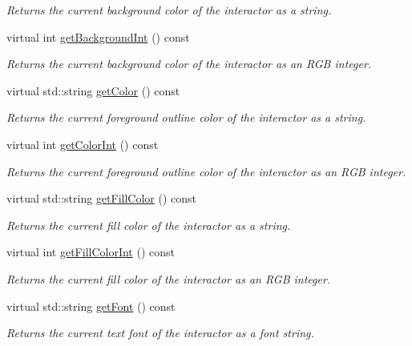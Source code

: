 \begin{DoxyCompactItemize}
\begin{DoxyCompactList}\small\item\em Returns the current background color of the interactor as a string. \end{DoxyCompactList}\item 
virtual int \mbox{\hyperlink{classGDrawingSurface_a9e827257a55cb8cf4d9de2ec6bcfd7a0}{get\+Background\+Int}} () const
\begin{DoxyCompactList}\small\item\em Returns the current background color of the interactor as an R\+GB integer. \end{DoxyCompactList}\item 
virtual std\+::string \mbox{\hyperlink{classGDrawingSurface_aa061dfa488c31e18549d64363c1d0e34}{get\+Color}} () const
\begin{DoxyCompactList}\small\item\em Returns the current foreground outline color of the interactor as a string. \end{DoxyCompactList}\item 
virtual int \mbox{\hyperlink{classGDrawingSurface_a9635c7af766cdc3417f346683fa0e6c1}{get\+Color\+Int}} () const
\begin{DoxyCompactList}\small\item\em Returns the current foreground outline color of the interactor as an R\+GB integer. \end{DoxyCompactList}\item 
virtual std\+::string \mbox{\hyperlink{classGDrawingSurface_a76f6964a11fde7c78e9751be184e1a3c}{get\+Fill\+Color}} () const
\begin{DoxyCompactList}\small\item\em Returns the current fill color of the interactor as a string. \end{DoxyCompactList}\item 
virtual int \mbox{\hyperlink{classGDrawingSurface_a88f4508d9271c4b5f5b5d6b780f223d0}{get\+Fill\+Color\+Int}} () const
\begin{DoxyCompactList}\small\item\em Returns the current fill color of the interactor as an R\+GB integer. \end{DoxyCompactList}\item 
virtual std\+::string \mbox{\hyperlink{classGDrawingSurface_a894a5502900794eeb27d084c21f1d77d}{get\+Font}} () const
\begin{DoxyCompactList}\small\item\em Returns the current text font of the interactor as a font string. \end{DoxyCompactList}\item 

\end{DoxyCompactItemize}
